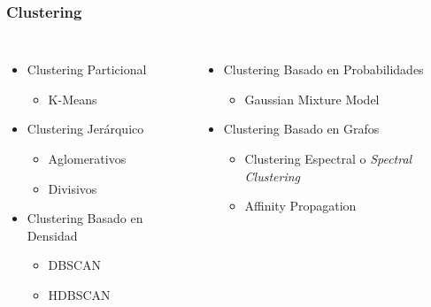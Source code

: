 \begin{frame}
    \frametitle{Clustering}

    \begin{columns}

        \begin{itemize}
            \item<2-> \alert{Clustering Particional}
            \begin{itemize}
                \item<3-> K-Means
            \end{itemize}

            \item<4-> \alert{Clustering Jerárquico}
            \begin{itemize}
                \item<5-> Aglomerativos
                \item<5-> Divisivos
            \end{itemize}

            \item<6-> \alert{Clustering Basado en Densidad}
            \begin{itemize}
                \item<7-> DBSCAN
                \item<7-> HDBSCAN
            \end{itemize}
        \end{itemize}


        \begin{itemize}
            \item<8-> \alert{Clustering Basado en Probabilidades}
            \begin{itemize}
                \item<9-> Gaussian Mixture Model
            \end{itemize}

            \item<10-> \alert{Clustering Basado en Grafos}
            \begin{itemize}
                \item<11-> Clustering Espectral o \textit{Spectral Clustering}
                \item<11-> Affinity Propagation
            \end{itemize}
        \end{itemize}

    \end{columns}


\end{frame}